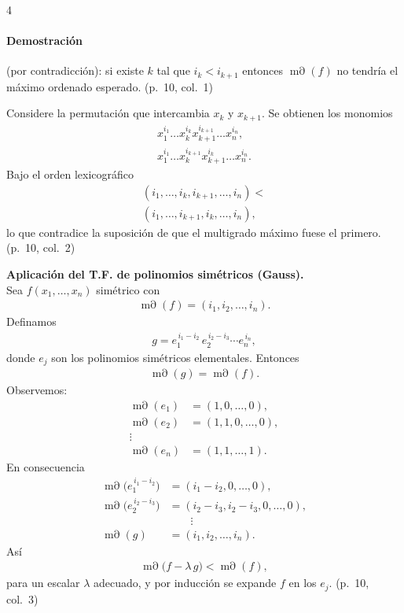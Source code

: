 \documentclass[landscape,a4paper]{article}
\begin{document}
\begin{multicols}{4}
\paragraph{Demostración} (por contradicción): si existe $k$ tal que $i_k<i_{k+1}$ entonces $\operatorname{m\partial}(f)$ no tendría el máximo ordenado esperado. (p.~10, col.~1)

\noindent Considere la permutación que intercambia $x_k$ y $x_{k+1}$. Se obtienen los monomios
\begin{align*}
  x_1^{i_1}\dots x_k^{i_k} x_{k+1}^{i_{k+1}}\dots x_n^{i_n}, \\
  x_1^{i_1}\dots x_k^{i_{k+1}} x_{k+1}^{i_k}\dots x_n^{i_n}.
\end{align*}
Bajo el orden lexicográfico
\begin{align*}
  (i_1,\dots,i_k,i_{k+1},\dots,i_n)
  <\\
  (i_1,\dots,i_{k+1},i_k,\dots,i_n),
\end{align*}
lo que contradice la suposición de que el multigrado máximo fuese el primero. (p.~10, col.~2)

\noindent \textbf{Aplicación del T.F. de polinomios simétricos (Gauss).}\\
Sea $f(x_1,\dots,x_n)$ simétrico con
\begin{align*}
  \operatorname{m\partial}(f)=(i_1,i_2,\dots,i_n).
\end{align*}
Definamos
\begin{align*}
  g = e_1^{\,i_1-i_2}\,e_2^{\,i_2-i_3}\cdots e_n^{\,i_n},
\end{align*}
donde $e_j$ son los polinomios simétricos elementales. Entonces
\begin{align*}
  \operatorname{m\partial}(g)=\operatorname{m\partial}(f).
\end{align*}
Observemos:
\begin{align*}
  \operatorname{m\partial}(e_1)&=(1,0,\dots,0),\\
  \operatorname{m\partial}(e_2)&=(1,1,0,\dots,0),\\
  \vdots\qquad\ & \\
  \operatorname{m\partial}(e_n)&=(1,1,\dots,1).
\end{align*}
En consecuencia
\begin{align*}
  \operatorname{m\partial}\!\bigl(e_1^{\,i_1-i_2}\bigr)&=(i_1-i_2,0,\dots,0),\\
  \operatorname{m\partial}\!\bigl(e_2^{\,i_2-i_3}\bigr)&=(i_2-i_3,i_2-i_3,0,\dots,0),\\
  &\qquad\vdots\\
  \operatorname{m\partial}(g)&=(i_1,i_2,\dots,i_n).
\end{align*}
Así
\begin{align*}
  \operatorname{m\partial}\bigl(f - \lambda\,g\bigr)<\operatorname{m\partial}(f),
\end{align*}
para un escalar $\lambda$ adecuado, y por inducción se expande $f$ en los $e_j$. (p.~10, col.~3)


\end{multicols}
\end{document}

